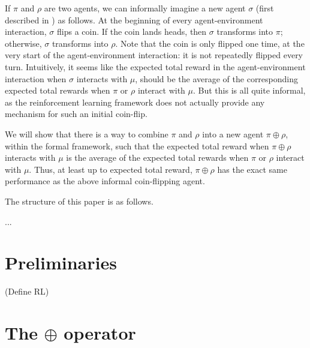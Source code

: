 \documentclass[runningheads]{llncs}
\begin{document}
If $\pi$ and $\rho$ are two agents, we can informally imagine a new agent
$\sigma$ (first described in \cite{alexander2021reward})
as follows. At the beginning of every agent-environment interaction,
$\sigma$ flips a coin. If the coin lands heads, then $\sigma$ transforms into
$\pi$; otherwise, $\sigma$ transforms into $\rho$. Note that the coin is only
flipped one time, at the very start of the agent-environment interaction:
it is not repeatedly flipped every turn. Intuitively, it seems like the
expected total reward in the agent-environment interaction
when $\sigma$ interacts with $\mu$, should be the average
of the corresponding expected total rewards when $\pi$ or $\rho$ interact
with $\mu$. But this is all quite informal, as the reinforcement learning
framework does not actually provide any mechanism for such an initial
coin-flip.

We will show that there is a way to combine $\pi$ and $\rho$ into a new
agent $\pi\oplus\rho$, within the formal framework, such that the expected
total reward when $\pi\oplus\rho$ interacts with $\mu$ is the average of the
expected total rewards when $\pi$ or $\rho$ interact with $\mu$.
Thus, at least up to expected total reward, $\pi\oplus\rho$ has the exact
same performance as the above informal coin-flipping agent.

The structure of this paper is as follows.

...

\section{Preliminaries}

(Define RL)

\section{The $\oplus$ operator}
\end{document}
